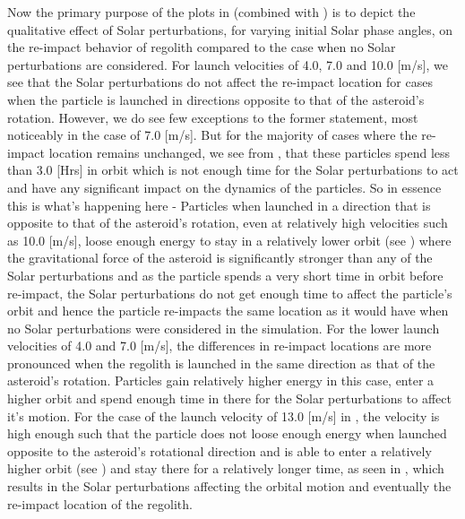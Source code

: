 Now the primary purpose of the plots in  (combined with ) is to depict the qualitative effect of Solar perturbations, for varying initial Solar phase angles, on the re-impact behavior of regolith compared to the case when no Solar perturbations are considered. For launch velocities of 4.0, 7.0 and 10.0 [m/s], we see that the Solar perturbations do not affect the re-impact location for cases when the particle is launched in directions opposite to that of the asteroid's rotation. However, we do see few exceptions to the former statement, most noticeably in the case of 7.0 [m/s]. But for the majority of cases where the re-impact location remains unchanged, we see from , that these particles spend less than 3.0 [Hrs] in orbit which is not enough time for the Solar perturbations to act and have any significant impact on the dynamics of the particles. So in essence this is what's happening here - Particles when launched in a direction that is opposite to that of the asteroid's rotation, even at relatively high velocities such as 10.0 [m/s], loose enough energy to stay in a relatively lower orbit (see ) where the gravitational force of the asteroid is significantly stronger than any of the Solar perturbations and as the particle spends a very short time in orbit before re-impact, the Solar perturbations do not get enough time to affect the particle's orbit and hence the particle re-impacts the same location as it would have when no Solar perturbations were considered in the simulation. For the lower launch velocities of 4.0 and 7.0 [m/s], the differences in re-impact locations are more pronounced when the regolith is launched in the same direction as that of the asteroid's rotation. Particles gain relatively higher energy in this case, enter a higher orbit and spend enough time in there for the Solar perturbations to affect it's motion. For the case of the launch velocity of 13.0 [m/s] in , the velocity is high enough such that the particle does not loose enough energy when launched opposite to the asteroid's rotational direction and is able to enter a relatively higher orbit (see ) and stay there for a relatively longer time, as seen in , which results in the Solar perturbations affecting the orbital motion and eventually the re-impact location of the regolith.
